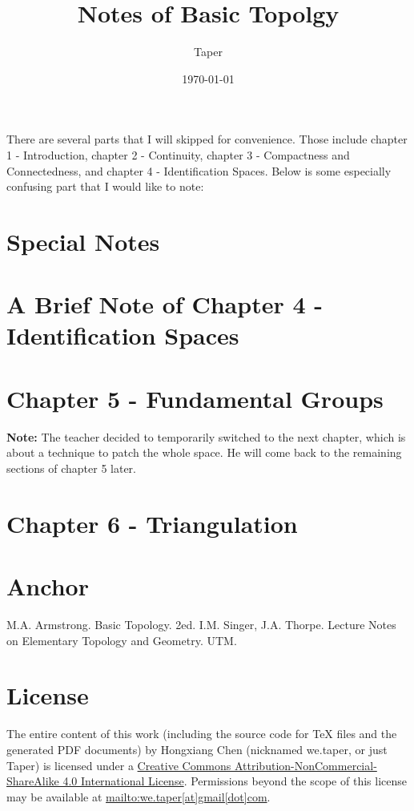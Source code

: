 \documentclass{article}
\title{Notes of Basic Topolgy}
\date{\today}
\author{Taper}
\begin{document}
\maketitle
{}
\tableofcontents
There are several parts that I will skipped for convenience. Those
include chapter 1 - Introduction, chapter 2 - Continuity, chapter 3 -
Compactness and Connectedness, and chapter 4 - Identification Spaces.
Below is some especially confusing part that I would like to note:

\section{Special Notes}
\label{sec:Special-Notes}


\section{A Brief Note of Chapter 4 - Identification Spaces}
\label{sec:Brief-Note-Chapter-4}


\section{Chapter 5 - Fundamental Groups}
\label{sec:Chapter-5-Fundamental-Groups}


\textbf{Note:} The teacher decided to temporarily switched to the next
chapter, which is about a technique to patch the whole space. He will
come back to the remaining sections of chapter 5 later.

\section{Chapter 6 - Triangulation}
\label{sec:Chapter6-Triangulation}


\section{Anchor}
\label{sec:Anchor}

\begin{thebibliography}{1}
     M.A. Armstrong. Basic Topology. 2ed.
     I.M. Singer, J.A. Thorpe. Lecture Notes on
    Elementary Topology and Geometry. UTM.
\end{thebibliography}
\printnomenclature
\section{License}
The entire content of this work (including the source code
for TeX files and the generated PDF documents) by 
Hongxiang Chen (nicknamed we.taper, or just Taper) is
licensed under a 
\href{http://creativecommons.org/licenses/by-nc-sa/4.0/}{Creative 
Commons Attribution-NonCommercial-ShareAlike 4.0 International 
License}. Permissions beyond the scope of this 
license may be available at \url{mailto:we.taper[at]gmail[dot]com}.
\end{document}
